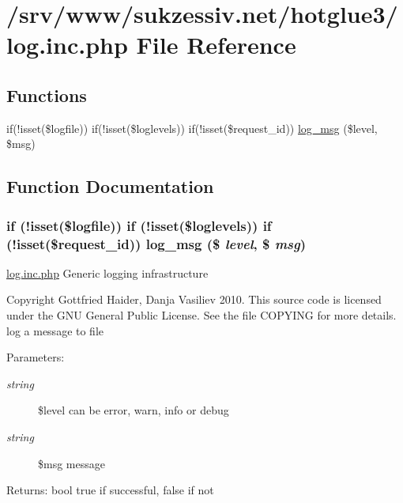 \hypertarget{log_8inc_8php}{
\section{/srv/www/sukzessiv.net/hotglue3/log.inc.php File Reference}
\label{log_8inc_8php}
}
\subsection*{Functions}
\begin{CompactItemize}
\item 
if(!isset(\$logfile)) if(!isset(\$loglevels)) if(!isset(\$request\_\-id)) \hyperlink{log_8inc_8php_0d59d693ca96c65b67de4b197954ce60}{log\_\-msg} (\$level, \$msg)
\end{CompactItemize}


\subsection{Function Documentation}
\hypertarget{log_8inc_8php_0d59d693ca96c65b67de4b197954ce60}{
\subsubsection[{log\_\-msg}]{\setlength{\rightskip}{0pt plus 5cm}if (!isset(\$logfile)) if (!isset(\$loglevels)) if (!isset(\$request\_\-id)) log\_\-msg (\$ {\em level}, \/  \$ {\em msg})}}
\label{log_8inc_8php_0d59d693ca96c65b67de4b197954ce60}


\hyperlink{log_8inc_8php}{log.inc.php} Generic logging infrastructure

Copyright Gottfried Haider, Danja Vasiliev 2010. This source code is licensed under the GNU General Public License. See the file COPYING for more details. log a message to file

\begin{Desc}
\item[Parameters:]
\begin{description}
\item[{\em string}]\$level can be error, warn, info or debug \item[{\em string}]\$msg message \end{description}
\end{Desc}
\begin{Desc}
\item[Returns:]bool true if successful, false if not \end{Desc}
